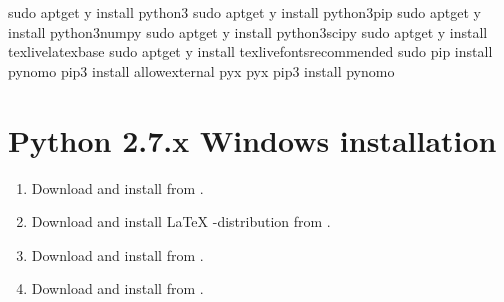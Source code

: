 \documentclass[a4paper,11pt,english]{sphinxmanual}
\begin{document}
\begin{sphinxVerbatim}[commandchars=\\\{\},formatcom=\scriptsize]
\PYGZdl{} sudo apt\PYGZhy{}get \PYGZhy{}y install python3
\PYGZdl{} sudo apt\PYGZhy{}get \PYGZhy{}y install python3\PYGZhy{}pip
\PYGZdl{} sudo apt\PYGZhy{}get \PYGZhy{}y install python3\PYGZhy{}numpy
\PYGZdl{} sudo apt\PYGZhy{}get \PYGZhy{}y install python3\PYGZhy{}scipy
\PYGZdl{} sudo apt\PYGZhy{}get \PYGZhy{}y install texlive\PYGZhy{}latex\PYGZhy{}base
\PYGZdl{} sudo apt\PYGZhy{}get \PYGZhy{}y install texlive\PYGZhy{}fonts\PYGZhy{}recommended
\PYGZdl{} sudo pip install pynomo
\PYGZdl{} pip3 install \PYGZhy{}\PYGZhy{}allow\PYGZhy{}external pyx pyx
\PYGZdl{} pip3 install pynomo
\end{sphinxVerbatim}


\section{Python 2.7.x Windows installation}
\label{\detokenize{installation/installation:python-2-7-x-windows-installation}}\begin{enumerate}
\def\theenumi{\arabic{enumi}}
\def\labelenumi{\theenumi .}
\makeatletter\def\p@enumii{\p@enumi \theenumi .}\makeatother
\item {} 
Download and install  from  .

\item {} 
Download and install  LaTeX -distribution from .

\item {} 
Download and install  from .

\item {} 
Download and install  from .

\end{enumerate}
\end{document}
